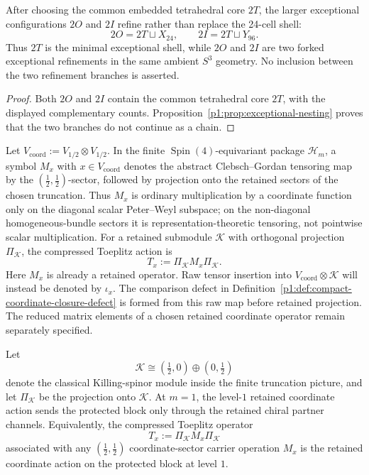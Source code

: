 \documentclass[11pt]{article}
\begin{document}
\begin{corollary}
\label{p1:cor:exceptional-refinements}
After choosing the common embedded tetrahedral core \(2T\), the larger exceptional configurations \(2O\) and \(2I\) refine rather than replace the 24-cell shell:
\[
2O = 2T \sqcup X_{24}, \qquad 2I = 2T \sqcup Y_{96}.
\]
Thus \(2T\) is the minimal exceptional shell, while \(2O\) and \(2I\) are two forked exceptional
refinements in the same ambient \(S^3\) geometry.  No inclusion between the two refinement branches is asserted.
\end{corollary}

\begin{proof}
Both \(2O\) and \(2I\) contain the common tetrahedral core \(2T\), with the displayed complementary counts.  Proposition~\ref{p1:prop:exceptional-nesting} proves that the two branches do not continue as a chain.
\end{proof}


\begin{definition}
\label{p1:def:coordinate-sector-action}
Let \(V_{\mathrm{coord}}:=V_{1/2}\otimes V_{1/2}\).  In the finite
\(\operatorname{Spin}(4)\)-equivariant package \(\mathcal H_m\), a symbol \(M_x\) with
\(x\in V_{\mathrm{coord}}\) denotes the abstract Clebsch--Gordan tensoring map by
the \((\tfrac12,\tfrac12)\)-sector, followed by projection onto the retained
sectors of the chosen truncation.  Thus \(M_x\) is ordinary multiplication by a
coordinate function only on the diagonal scalar Peter--Weyl subspace; on the
non-diagonal homogeneous-bundle sectors it is representation-theoretic tensoring,
not pointwise scalar multiplication.  For a retained submodule \(\mathcal K\) with
orthogonal projection \(\Pi_{\mathcal K}\), the compressed Toeplitz action is
\[
    T_x:=\Pi_{\mathcal K}M_x\Pi_{\mathcal K}.
\]
Here \(M_x\) is already a retained operator.  Raw tensor insertion into
\(V_{\mathrm{coord}}\otimes\mathcal K\) will instead be denoted by
\(\iota_x\).  The comparison defect in
Definition~\ref{p1:def:compact-coordinate-closure-defect} is formed from this
raw map before retained projection.  The reduced matrix elements of a
chosen retained coordinate operator remain separately specified.
\end{definition}

\begin{proposition}
\label{p1:prop:closure-m1}
Let
\[
\mathcal K\cong (\tfrac12,0)\oplus(0,\tfrac12)
\]
denote the classical Killing-spinor module inside the finite truncation picture,
and let \(\Pi_{\mathcal K}\) be the projection onto \(\mathcal K\).  At \(m=1\),
the level-\(1\) retained coordinate action sends the protected block only through the retained chiral partner channels.  Equivalently, the compressed Toeplitz operator
\[
    T_x:=\Pi_{\mathcal K}M_x\Pi_{\mathcal K}
\]
associated with any \((\tfrac12,\tfrac12)\) coordinate-sector carrier operation \(M_x\) is the retained coordinate action on the protected block at level \(1\).
\end{proposition}
\end{document}
